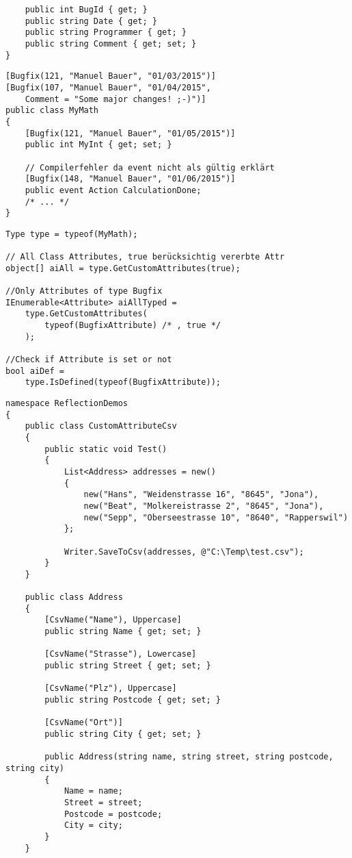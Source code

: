 \begin{multicols*}{2}
\begin{lstlisting}
    public int BugId { get; }
    public string Date { get; }
    public string Programmer { get; }
    public string Comment { get; set; }
}
\end{lstlisting}
\begin{lstlisting}
[Bugfix(121, "Manuel Bauer", "01/03/2015")] 
[Bugfix(107, "Manuel Bauer", "01/04/2015",
    Comment = "Some major changes! ;-)")]
public class MyMath
{
    [Bugfix(121, "Manuel Bauer", "01/05/2015")]
    public int MyInt { get; set; }
    
    // Compilerfehler da event nicht als gültig erklärt
    [Bugfix(148, "Manuel Bauer", "01/06/2015")]
    public event Action CalculationDone;
    /* ... */
}
\end{lstlisting}
\begin{lstlisting}
Type type = typeof(MyMath);

// All Class Attributes, true berücksichtig vererbte Attr
object[] aiAll = type.GetCustomAttributes(true);

//Only Attributes of type Bugfix
IEnumerable<Attribute> aiAllTyped =
    type.GetCustomAttributes(
        typeof(BugfixAttribute) /* , true */
    );

//Check if Attribute is set or not
bool aiDef =
    type.IsDefined(typeof(BugfixAttribute));   
\end{lstlisting}
\begin{lstlisting}
namespace ReflectionDemos
{
    public class CustomAttributeCsv
    {
        public static void Test()
        {
            List<Address> addresses = new()
            {
                new("Hans", "Weidenstrasse 16", "8645", "Jona"),
                new("Beat", "Molkereistrasse 2", "8645", "Jona"),
                new("Sepp", "Oberseestrasse 10", "8640", "Rapperswil")
            };

            Writer.SaveToCsv(addresses, @"C:\Temp\test.csv");
        }
    }

    public class Address
    {
        [CsvName("Name"), Uppercase]
        public string Name { get; set; }

        [CsvName("Strasse"), Lowercase]
        public string Street { get; set; }

        [CsvName("Plz"), Uppercase]
        public string Postcode { get; set; }

        [CsvName("Ort")]
        public string City { get; set; }

        public Address(string name, string street, string postcode, string city)
        {
            Name = name;
            Street = street;
            Postcode = postcode;
            City = city;
        }
    }


\end{lstlisting}
\end{multicols*}
